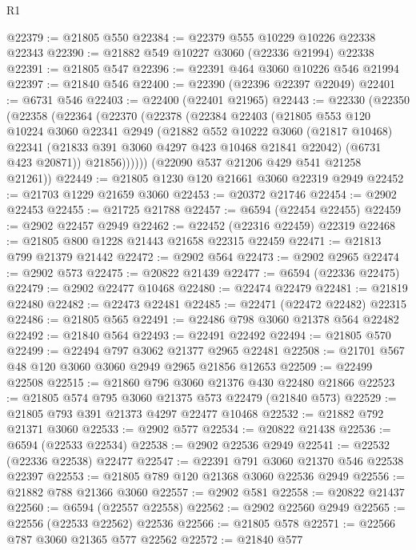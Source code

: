 \begin{lexlean}{R1}
\begin{coremodule}
@22379 := @21805 @550
@22384 := @22379 @555 @10229 @10226 @22338 @22343
@22390 := @21882 @549 @10227 @3060 (@22336 @21994) @22338
@22391 := @21805 @547
@22396 := @22391 @464 @3060 @10226 @546 @21994
@22397 := @21840 @546
@22400 := @22390 (@22396 @22397 @22049)
@22401 := @6731 @546
@22403 := @22400 (@22401 @21965)
@22443 := @22330
    (@22350
      (@22358
        (@22364
          (@22370
            (@22378
              (@22384
                @22403
                (@21805
                  @553
                  @120
                  @10224
                  @3060
                  @22341
                  @2949
                  (@21882
                    @552
                    @10222
                    @3060
                    (@21817 @10468)
                    @22341
                    (@21833 @391 @3060 @4297 @423 @10468 @21841 @22042)
                    (@6731 @423 @20871))
                  @21856))))))
      (@22090 @537 @21206 @429 @541 @21258 @21261))
@22449 := @21805 @1230 @120 @21661 @3060 @22319 @2949
@22452 := @21703 @1229 @21659 @3060
@22453 := @20372 @21746
@22454 := @2902 @22453
@22455 := @21725 @21788
@22457 := @6594 (@22454 @22455)
@22459 := @2902 @22457 @2949
@22462 := @22452 (@22316 @22459) @22319
@22468 := @21805 @800 @1228 @21443 @21658 @22315 @22459
@22471 := @21813 @799 @21379 @21442
@22472 := @2902 @564
@22473 := @2902 @2965
@22474 := @2902 @573
@22475 := @20822 @21439
@22477 := @6594 (@22336 @22475)
@22479 := @2902 @22477 @10468
@22480 := @22474 @22479
@22481 := @21819 @22480
@22482 := @22473 @22481
@22485 := @22471 (@22472 @22482) @22315
@22486 := @21805 @565
@22491 := @22486 @798 @3060 @21378 @564 @22482
@22492 := @21840 @564
@22493 := @22491 @22492
@22494 := @21805 @570
@22499 := @22494 @797 @3062 @21377 @2965 @22481
@22508 := @21701 @567 @48 @120 @3060 @3060 @2949 @2965 @21856 @12653
@22509 := @22499 @22508
@22515 := @21860 @796 @3060 @21376 @430 @22480 @21866
@22523 := @21805 @574 @795 @3060 @21375 @573 @22479 (@21840 @573)
@22529 := @21805 @793 @391 @21373 @4297 @22477 @10468
@22532 := @21882 @792 @21371 @3060
@22533 := @2902 @577
@22534 := @20822 @21438
@22536 := @6594 (@22533 @22534)
@22538 := @2902 @22536 @2949
@22541 := @22532 (@22336 @22538) @22477
@22547 := @22391 @791 @3060 @21370 @546 @22538 @22397
@22553 := @21805 @789 @120 @21368 @3060 @22536 @2949
@22556 := @21882 @788 @21366 @3060
@22557 := @2902 @581
@22558 := @20822 @21437
@22560 := @6594 (@22557 @22558)
@22562 := @2902 @22560 @2949
@22565 := @22556 (@22533 @22562) @22536
@22566 := @21805 @578
@22571 := @22566 @787 @3060 @21365 @577 @22562
@22572 := @21840 @577

\end{coremodule}
\end{lexlean}
